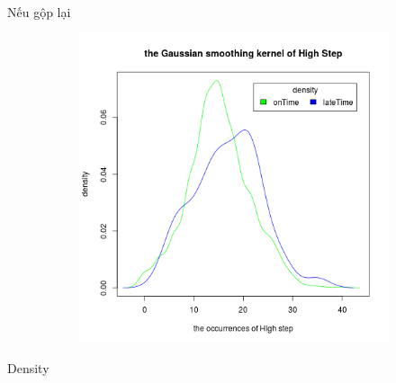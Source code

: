 \documentclass[a4paper, 13pt]{report}
\begin{document}
\FloatBarrier
Nếu gộp lại \\
\FloatBarrier
\begin{figure}[h]
    \begin{subfigure}[b]{0.7\textwidth}
        \includegraphics[width=\textwidth]{DensityHighStep.png}
    \end{subfigure}
\end{figure}
\FloatBarrier
Density 
\FloatBarrier
\end{document}
